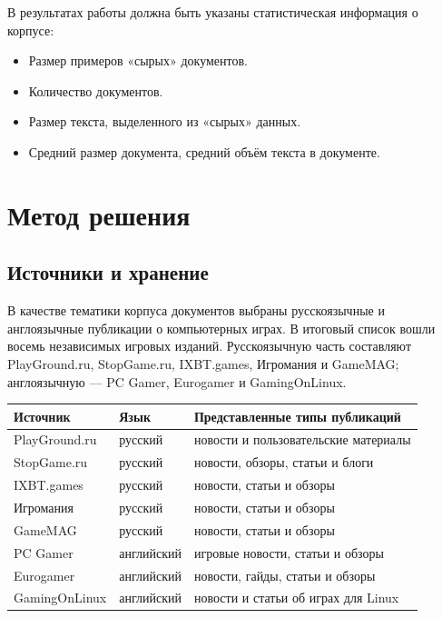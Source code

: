 \documentclass[12pt,a4paper]{article}
\begin{document}
В результатах работы должна быть указаны статистическая информация о корпусе:

\begin{itemize}
  \item Размер примеров «сырых» документов.
  \item Количество документов.
  \item Размер текста, выделенного из «сырых» данных.
  \item Средний размер документа, средний объём текста в документе.
\end{itemize}

\section{Метод решения}

\subsection{Источники и хранение}

В качестве тематики корпуса документов выбраны русскоязычные и англоязычные
публикации о компьютерных играх. В итоговый список вошли восемь независимых
игровых изданий. Русскоязычную часть составляют PlayGround.ru, StopGame.ru,
IXBT.games, Игромания и GameMAG; англоязычную --- PC Gamer, Eurogamer и
GamingOnLinux.

\begin{center}
\small
\renewcommand{\arraystretch}{1.12}
\begin{tabularx}{\textwidth}{@{}P{0.22\textwidth}P{0.17\textwidth}X@{}}
\toprule
Источник & Язык & Представленные типы публикаций \\
\midrule
PlayGround.ru & русский & новости и пользовательские материалы \\
StopGame.ru & русский & новости, обзоры, статьи и блоги \\
IXBT.games & русский & новости, статьи и обзоры \\
Игромания & русский & новости, статьи и обзоры \\
GameMAG & русский & новости, статьи и обзоры \\
PC Gamer & английский & игровые новости, статьи и обзоры \\
Eurogamer & английский & новости, гайды, статьи и обзоры \\
GamingOnLinux & английский & новости и статьи об играх для Linux \\
\bottomrule
\end{tabularx}
\end{center}
\normalsize
\end{document}
